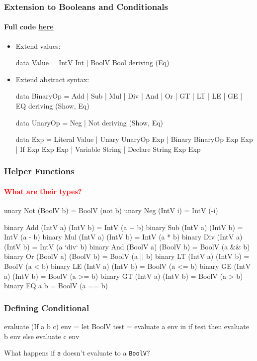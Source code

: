 \documentclass{beamer}
\begin{document}
\begin{frame}[fragile]
\frametitle{Extension to Booleans and Conditionals}
\framesubtitle{Full code 
\href{https://harrisonwl.github.io/assets/courses/popl/fall2016/aopl/code/IntBool.hs.htm}{here}}


\begin{itemize}
\item Extend values:
\begin{hcode}
data Value  =  IntV  Int
            |  BoolV Bool
 deriving (Eq)
\end{hcode}
\item Extend abstract syntax:
\begin{hcode}
data BinaryOp = Add | Sub | Mul | Div | And | Or
              | GT | LT | LE | GE | EQ
                       deriving (Show, Eq)

data UnaryOp = Neg | Not deriving (Show, Eq)

data Exp  = Literal   Value
          | Unary     UnaryOp Exp
          | Binary    BinaryOp Exp Exp
          | If        Exp Exp Exp
          | Variable  String
          | Declare   String Exp Exp
\end{hcode}
\end{itemize}

\end{frame}

\begin{frame}[fragile]
\frametitle{Helper Functions}
\framesubtitle{\textcolor{red}{What are their types?}}

\begin{hcode}
unary Not (BoolV b) = BoolV (not b)
unary Neg (IntV i)  = IntV (-i)

binary Add (IntV a)  (IntV b)  = IntV (a + b)
binary Sub (IntV a)  (IntV b)  = IntV (a - b)
binary Mul (IntV a)  (IntV b)  = IntV (a * b)
binary Div (IntV a)  (IntV b)  = IntV (a `div` b)
binary And (BoolV a) (BoolV b) = BoolV (a && b)
binary Or  (BoolV a) (BoolV b) = BoolV (a || b)
binary LT  (IntV a)  (IntV b)  = BoolV (a < b)
binary LE  (IntV a)  (IntV b)  = BoolV (a <= b)
binary GE  (IntV a)  (IntV b)  = BoolV (a >= b)
binary GT  (IntV a)  (IntV b)  = BoolV (a > b)
binary EQ  a         b         = BoolV (a == b)
\end{hcode}

\end{frame}
\begin{frame}[fragile]
\frametitle{Defining Conditional}

\begin{hcode}
evaluate (If a b c) env =
  let BoolV test = evaluate a env in
    if test then evaluate b env
            else evaluate c env
\end{hcode}

\vfill
\pause
\noindent What happens if {\tt a} doesn't evaluate to a {\tt BoolV}?
\end{frame}
\end{document}
